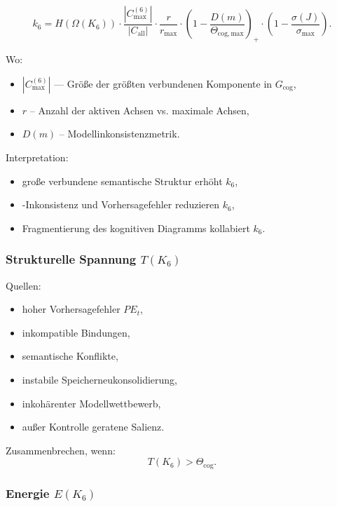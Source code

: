 \[
k_6
= H(\Omega(K_6))
  \cdot \frac{|C_{\max}^{(6)}|}{|C_{\mathrm{all}}|}
  \cdot \frac{r}{r_{\max}}
  \cdot \left(1 - \frac{D(m)}{\Theta_{\mathrm{cog,max}}}\right)_+
  \cdot \left(1-\frac{\sigma(J)}{\sigma_{\max}}\right).
\]

Wo:
\begin{itemize}
    \item $|C_{\max}^{(6)}|$ — Größe der größten verbundenen Komponente in $G_{\mathrm{cog}}$,
    \item $r$ – Anzahl der aktiven Achsen vs. maximale Achsen,
    \item $D(m)$ – Modellinkonsistenzmetrik.
\end{itemize}

Interpretation:
\begin{itemize}
    \item große verbundene semantische Struktur erhöht $k_6$,
    \item-Inkonsistenz und Vorhersagefehler reduzieren $k_6$,
    \item Fragmentierung des kognitiven Diagramms kollabiert $k_6$.
\end{itemize}

\subsubsection{Strukturelle Spannung \texorpdfstring{$T(K_6)$}{T(K_6)}}

Quellen:
\begin{itemize}
    \item hoher Vorhersagefehler $PE_t$,
    \item inkompatible Bindungen,
    \item semantische Konflikte,
    \item instabile Speicherneukonsolidierung,
    \item inkohärenter Modellwettbewerb,
    \item außer Kontrolle geratene Salienz.
\end{itemize}

Zusammenbrechen, wenn:
\[
T(K_6) > \Theta_{\mathrm{cog}}.
\]

\subsubsection{Energie \texorpdfstring{$E(K_6)$}{E(K_6)}}

